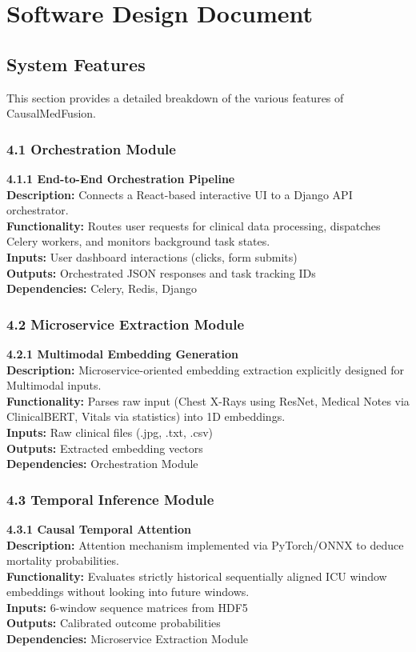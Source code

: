 \documentclass{fisatprojectfinal}
\begin{document}
\section{Software Design Document}
\subsection{System Features}
This section provides a detailed breakdown of the various features of CausalMedFusion.

\subsubsection{4.1 Orchestration Module}
\textbf{4.1.1 End-to-End Orchestration Pipeline} \\
\textbf{Description:} Connects a React-based interactive UI to a Django API orchestrator. \\
\textbf{Functionality:} Routes user requests for clinical data processing, dispatches Celery workers, and monitors background task states. \\
\textbf{Inputs:} User dashboard interactions (clicks, form submits) \\
\textbf{Outputs:} Orchestrated JSON responses and task tracking IDs \\
\textbf{Dependencies:} Celery, Redis, Django

\subsubsection{4.2 Microservice Extraction Module}
\textbf{4.2.1 Multimodal Embedding Generation} \\
\textbf{Description:} Microservice-oriented embedding extraction explicitly designed for Multimodal inputs. \\
\textbf{Functionality:} Parses raw input (Chest X-Rays using ResNet, Medical Notes via ClinicalBERT, Vitals via statistics) into 1D embeddings. \\
\textbf{Inputs:} Raw clinical files (.jpg, .txt, .csv) \\
\textbf{Outputs:} Extracted embedding vectors \\
\textbf{Dependencies:} Orchestration Module

\subsubsection{4.3 Temporal Inference Module}
\textbf{4.3.1 Causal Temporal Attention} \\
\textbf{Description:} Attention mechanism implemented via PyTorch/ONNX to deduce mortality probabilities. \\
\textbf{Functionality:} Evaluates strictly historical sequentially aligned ICU window embeddings without looking into future windows. \\
\textbf{Inputs:} 6-window sequence matrices from HDF5 \\
\textbf{Outputs:} Calibrated outcome probabilities \\
\textbf{Dependencies:} Microservice Extraction Module
\end{document}
